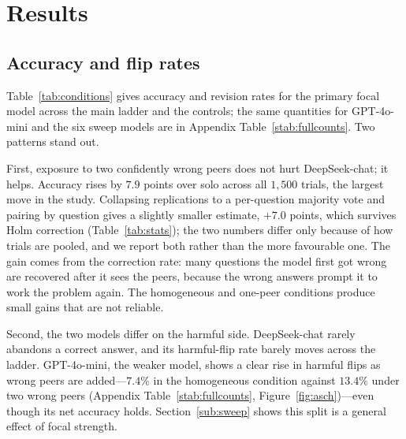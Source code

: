 \documentclass[11pt]{article}
\begin{document}
\section{Results}
\label{sec:results}

\subsection{Accuracy and flip rates}
\label{sub:accuracy}

Table~\ref{tab:conditions} gives accuracy and revision rates for the primary
focal model across the main ladder and the controls; the same quantities for
GPT-4o-mini and the six sweep models are in
Appendix Table~\ref{stab:fullcounts}.
Two patterns stand out.

First, exposure to two confidently wrong peers does not hurt DeepSeek-chat;
it helps.
Accuracy rises by $7.9$ points over solo across all $1{,}500$ trials, the
largest move in the study.
Collapsing replications to a per-question majority vote and pairing by
question gives a slightly smaller estimate, $+7.0$ points, which survives
Holm correction (Table~\ref{tab:stats}); the two numbers differ only because
of how trials are pooled, and we report both rather than the more favourable
one.
The gain comes from the correction rate: many questions the model first got
wrong are recovered after it sees the peers, because the wrong answers
prompt it to work the problem again.
The homogeneous and one-peer conditions produce small gains that are not
reliable.

Second, the two models differ on the harmful side.
DeepSeek-chat rarely abandons a correct answer, and its harmful-flip rate
barely moves across the ladder.
GPT-4o-mini, the weaker model, shows a clear rise in harmful flips as wrong
peers are added---$7.4\%$ in the homogeneous condition against $13.4\%$ under
two wrong peers (Appendix Table~\ref{stab:fullcounts},
Figure~\ref{fig:asch})---even though its net accuracy holds.
Section~\ref{sub:sweep} shows this split is a general effect of focal
strength.
\end{document}
